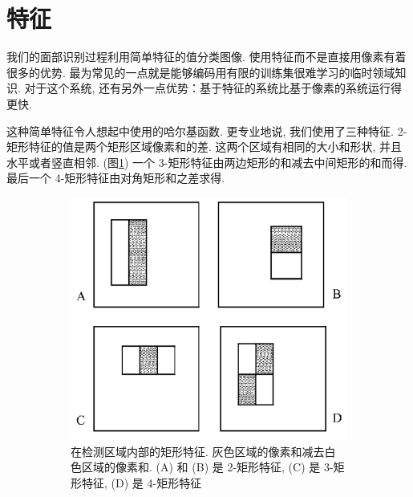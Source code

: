 \documentclass[a4paper,utf8,11pt, onecolumn]{ctexart}
\renewcommand{\captionlabelfont}{\kaishu\zihao{5}}
\begin{document}
\section{特征}\label{sec:feature}
我们的面部识别过程利用简单特征的值分类图像. 使用特征而不是直接用像素有着很多的优势. 最为常见的一点就是能够编码用有限的训练集很难学习的临时领域知识. 对于这个系统, 还有另外一点优势：基于特征的系统比基于像素的系统运行得更快. 

这种简单特征令人想起\citet{papageorgiou1998general}中使用的哈尔基函数. 更专业地说, 我们使用了三种特征. 2-矩形特征的值是两个矩形区域像素和的差. 这两个区域有相同的大小和形状, 并且水平或者竖直相邻. (图\ref{fig:rectangle})
一个 3-矩形特征由两边矩形的和减去中间矩形的和而得. 最后一个 4-矩形特征由对角矩形和之差求得. 
\begin{figure}[!htb]
\centering
\begin{subfigure}{0.3\textwidth}
\includegraphics[width=\textwidth]{rectangle.png}
\renewcommand{\captionlabelfont}{\kaishu\zihao{6}}
\caption{ 在检测区域内部的矩形特征. 灰色区域的像素和减去白色区域的像素和. (A) 和 (B) 是 2-矩形特征, (C) 是 3-矩形特征, (D) 是 4-矩形特征}
\label{fig:rectangle}
\end{subfigure}
\quad\quad\quad\quad
\begin{subfigure}{0.3\textwidth}

\end{subfigure}
\end{figure}
\end{document}
